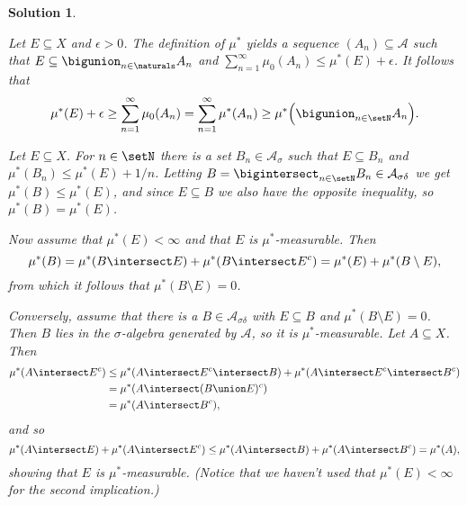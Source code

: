 \documentclass[article, a4paper, 11pt, oneside]{memoir}
\numberwithin{equation}{chapter}
\newcommand{\calA}{\mathcal{A}}
\theoremstyle{nonumberplain}
\newtheorem{solution}{Solution}
\begin{document}
\begin{solution}
\begin{solutionsec}
	\item Let $E \subseteq X$ and $\epsilon > 0$. The definition of $\mu^*$ yields a sequence $(A_n) \subseteq \calA$ such that $E \subseteq \bigunion_{n\in\naturals} A_n$ and $\sum_{n=1}^\infty \mu_0(A_n) \leq \mu^*(E) + \epsilon$. It follows that
	\begin{equation*}
		\mu^*(E) + \epsilon
			\geq \sum_{n=1}^\infty \mu_0(A_n)
			= \sum_{n=1}^\infty \mu^*(A_n)
			\geq \mu^* \Bigl( \bigunion_{n \in \setN} A_n \Bigr).
	\end{equation*}

	\item Let $E \subseteq X$. For $n \in \setN$ there is a set $B_n \in \calA_\sigma$ such that $E \subseteq B_n$ and $\mu^*(B_n) \leq \mu^*(E) + 1/n$. Letting $B = \bigintersect_{n \in \setN} B_n \in \calA_{\sigma\delta}$ we get $\mu^*(B) \leq \mu^*(E)$, and since $E \subseteq B$ we also have the opposite inequality, so $\mu^*(B) = \mu^*(E)$.
	
	Now assume that $\mu^*(E) < \infty$ and that $E$ is $\mu^*$-measurable. Then
	\begin{equation*}
		\mu^*(B)
			= \mu^*(B \intersect E) + \mu^*(B \intersect E^c)
			= \mu^*(E) + \mu^*(B \setminus E),
	\end{equation*}
	from which it follows that $\mu^*(B \setminus E) = 0$.

	Conversely, assume that there is a $B \in \calA_{\sigma\delta}$ with $E \subseteq B$ and $\mu^*(B \setminus E) = 0$. Then $B$ lies in the $\sigma$-algebra generated by $\calA$, so it is $\mu^*$-measurable. Let $A \subseteq X$. Then
	\begin{align*}
		\mu^*(A \intersect E^c)
			&\leq \mu^*(A \intersect E^c \intersect B) + \mu^*(A \intersect E^c \intersect B^c) \\
			&= \mu^*(A \intersect (B \union E)^c) \\
			&= \mu^*(A \intersect B^c),
	\end{align*}
	and so
	\begin{equation*}
		\mu^*(A \intersect E) + \mu^*(A \intersect E^c)
			\leq \mu^*(A \intersect B) + \mu^*(A \intersect B^c)
			= \mu^*(A),
	\end{equation*}
	showing that $E$ is $\mu^*$-measurable. (Notice that we haven't used that $\mu^*(E) < \infty$ for the second implication.)


\end{solutionsec}
\end{solution}
\end{document}
